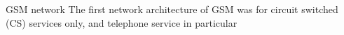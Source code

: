 \begin{section}{GSM network}
  The first network architecture of GSM was for circuit switched (CS) services only, and telephone
  service in particular

\end{section}
